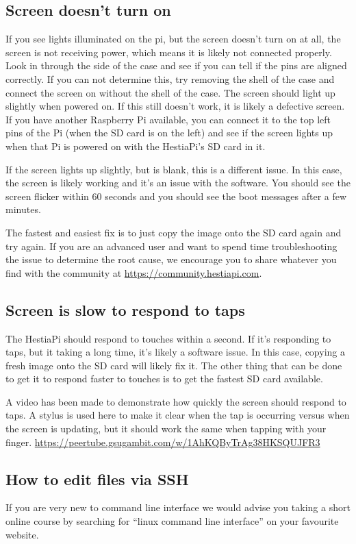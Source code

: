 \subsection{Screen doesn't turn on}
If you see lights illuminated on the pi, but the screen doesn't turn on at all,
the screen is not receiving power, which means it is likely not connected
properly. Look in through the side of the case and see if you can tell if the
pins are aligned correctly. If you can not determine this, try removing the
shell of the case and connect the screen on without the shell of the case. The
screen should light up slightly when powered on. If this still doesn't work, it
is likely a defective screen. If you have another Raspberry Pi available, you
can connect it to the top left pins of the Pi (when the SD card is on the left)
and see if the screen lights up when that Pi is powered on with the HestiaPi's
SD card in it.

If the screen lights up slightly, but is blank, this is a different issue. In
this case, the screen is likely working and it's an issue with the software.
You should see the screen flicker within 60 seconds and you should see the
boot messages after a few minutes.

The fastest and easiest fix is to just copy the image onto the SD card again
and try again. If you are an advanced user and want to spend time
troubleshooting the issue to determine the root cause, we encourage you to
share whatever you find with the community at
\url{https://community.hestiapi.com}.

\subsection{Screen is slow to respond to taps}
The HestiaPi should respond to touches within a second. If it's responding
to taps, but it taking a long time, it's likely a software issue. In this
case, copying a fresh image onto the SD card will likely fix it. The other
thing that can be done to get it to respond faster to touches is to get the
fastest SD card available.

A video has been made to demonstrate how quickly the screen should respond to
taps. A stylus is used here to make it clear when the tap is occurring versus
when the screen is updating, but it should work the same when tapping with your
finger. \url{https://peertube.gsugambit.com/w/1AhKQByTrAg38HKSQUJFR3}

\subsection{How to edit files via SSH}
If you are very new to command line interface we would advise you taking a
short online course by searching for ``linux command line interface'' on your
favourite website.

